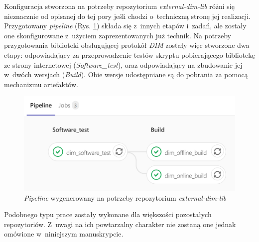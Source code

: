 \newpage

Konfiguracja stworzona na potrzeby repozytorium \textit{external-dim-lib} różni się nieznacznie od opisanej do tej pory jeśli chodzi o~techniczną stronę jej realizacji. Przygotowany \textit{pipeline} (Rys. \ref{fig:pipelineDIM}) składa się z~innych etapów i~zadań, ale zostały one skonfigurowane z~użyciem zaprezentowanych już technik. Na potrzeby przygotowania biblioteki obsługującej protokół \textit{DIM} zostały więc stworzone dwa etapy: odpowiadający za przeprowadzenie testów skryptu pobierającego bibliotekę ze strony internetowej (\textit{Software\_test}), oraz odpowiadający na zbudowanie jej w~dwóch wersjach (\textit{Build}). Obie wersje udostępniane są do pobrania za pomocą mechanizmu artefaktów.  

\begin{figure}[H]
\centering
\includegraphics[width=\textwidth]{res/png/pipelineDIM}
\caption{\textit{Pipeline} wygenerowany na potrzeby repozytorium \textit{external-dim-lib}}
\label{fig:pipelineDIM}
\end{figure}

Podobnego typu prace zostały wykonane dla większości pozostałych repozytoriów. Z~uwagi na ich powtarzalny charakter nie zostaną one jednak omówione w~niniejszym manuskrypcie. 

